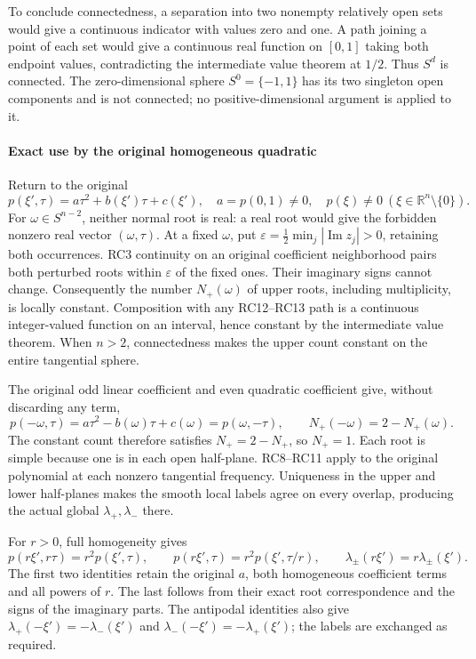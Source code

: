 \documentclass[
  11pt,
]{article}
\begin{document}
To conclude connectedness, a separation into two nonempty relatively
open sets would give a continuous indicator with values zero and one. A
path joining a point of each set would give a continuous real function
on \([0,1]\) taking both endpoint values, contradicting the intermediate
value theorem at \(1/2\). Thus \(S^d\) is connected. The
zero-dimensional sphere \(S^0=\{-1,1\}\) has its two singleton open
components and is not connected; no positive-dimensional argument is
applied to it.

\paragraph{Exact use by the original homogeneous
quadratic}\label{exact-use-by-the-original-homogeneous-quadratic}

Return to the original \[
 p(\xi',\tau)=a\tau^2+b(\xi')\tau+c(\xi'),\quad
 a=p(0,1)\ne0,\quad p(\xi)\ne0\ (\xi\in\mathbb R^n\setminus\{0\}).
 \tag{RC14}
\] For \(\omega\in S^{n-2}\), neither normal root is real: a real root
would give the forbidden nonzero real vector \((\omega,\tau)\). At a
fixed \(\omega\), put
\(\varepsilon=\frac12\min_j|\operatorname{Im}z_j|>0\), retaining both
occurrences. RC3 continuity on an original coefficient neighborhood
pairs both perturbed roots within \(\varepsilon\) of the fixed ones.
Their imaginary signs cannot change. Consequently the number
\(N_+(\omega)\) of upper roots, including multiplicity, is locally
constant. Composition with any RC12--RC13 path is a continuous
integer-valued function on an interval, hence constant by the
intermediate value theorem. When \(n>2\), connectedness makes the upper
count constant on the entire tangential sphere.

The original odd linear coefficient and even quadratic coefficient give,
without discarding any term, \[
 p(-\omega,\tau)=a\tau^2-b(\omega)\tau+c(\omega)
                =p(\omega,-\tau),\qquad
 N_+(-\omega)=2-N_+(\omega).
 \tag{RC15}
\] The constant count therefore satisfies \(N_+=2-N_+\), so \(N_+=1\).
Each root is simple because one is in each open half-plane. RC8--RC11
apply to the original polynomial at each nonzero tangential frequency.
Uniqueness in the upper and lower half-planes makes the smooth local
labels agree on every overlap, producing the actual global
\(\lambda_+,\lambda_-\) there.

For \(r>0\), full homogeneity gives \[
 p(r\xi',r\tau)=r^2p(\xi',\tau),\qquad
 p(r\xi',\tau)=r^2p(\xi',\tau/r),\qquad
 \lambda_\pm(r\xi')=r\lambda_\pm(\xi').
 \tag{RC16}
\] The first two identities retain the original \(a\), both homogeneous
coefficient terms and all powers of \(r\). The last follows from their
exact root correspondence and the signs of the imaginary parts. The
antipodal identities also give \(\lambda_+(-\xi')=-\lambda_-(\xi')\) and
\(\lambda_-(-\xi')=-\lambda_+(\xi')\); the labels are exchanged as
required.
\end{document}
